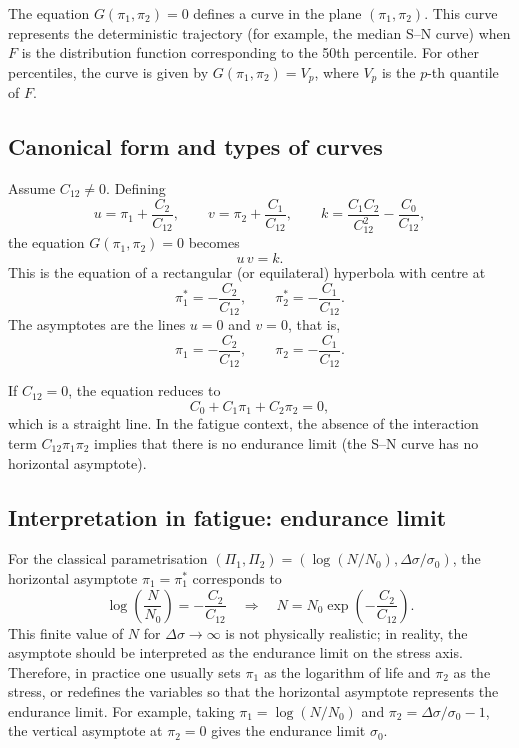 The equation \(G(\pi_1,\pi_2)=0\) defines a curve in the plane \((\pi_1,\pi_2)\). This curve represents the deterministic trajectory (for example, the median S–N curve) when \(F\) is the distribution function corresponding to the 50th percentile. For other percentiles, the curve is given by \(G(\pi_1,\pi_2)=V_p\), where \(V_p\) is the \(p\)-th quantile of \(F\).

\subsection{Canonical form and types of curves}

Assume \(C_{12}\neq0\). Defining
\[
u = \pi_1 + \frac{C_2}{C_{12}},\qquad v = \pi_2 + \frac{C_1}{C_{12}},\qquad k = \frac{C_1C_2}{C_{12}^2} - \frac{C_0}{C_{12}},
\]
the equation \(G(\pi_1,\pi_2)=0\) becomes
\begin{equation}
u\,v = k.
\label{eq:canonical-hyperbola}
\end{equation}
This is the equation of a rectangular (or equilateral) hyperbola with centre at
\[
\pi_1^* = -\frac{C_2}{C_{12}},\qquad \pi_2^* = -\frac{C_1}{C_{12}}.
\]
The asymptotes are the lines \(u=0\) and \(v=0\), that is,
\begin{equation}
\pi_1 = -\frac{C_2}{C_{12}},\qquad \pi_2 = -\frac{C_1}{C_{12}}.
\label{eq:asymptotes-2D}
\end{equation}

If \(C_{12}=0\), the equation reduces to
\[
C_0 + C_1\pi_1 + C_2\pi_2 = 0,
\]
which is a straight line. In the fatigue context, the absence of the interaction term \(C_{12}\pi_1\pi_2\) implies that there is no endurance limit (the S–N curve has no horizontal asymptote).

\subsection{Interpretation in fatigue: endurance limit}

For the classical parametrisation \((\Pi_1,\Pi_2)=(\log(N/N_0),\Delta\sigma/\sigma_0)\), the horizontal asymptote \(\pi_1=\pi_1^*\) corresponds to
\[
\log\left(\frac{N}{N_0}\right) = -\frac{C_2}{C_{12}} \quad\Longrightarrow\quad N = N_0 \exp\left(-\frac{C_2}{C_{12}}\right).
\]
This finite value of \(N\) for \(\Delta\sigma\to\infty\) is not physically realistic; in reality, the asymptote should be interpreted as the endurance limit on the stress axis. Therefore, in practice one usually sets \(\pi_1\) as the logarithm of life and \(\pi_2\) as the stress, or redefines the variables so that the horizontal asymptote represents the endurance limit. For example, taking \(\pi_1 = \log(N/N_0)\) and \(\pi_2 = \Delta\sigma/\sigma_0 - 1\), the vertical asymptote at \(\pi_2=0\) gives the endurance limit \(\sigma_0\).

